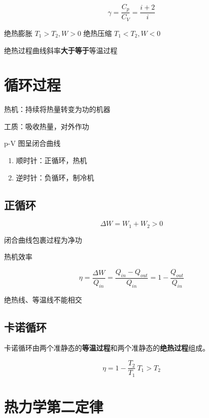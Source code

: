 \begin{enumerate}
          \begin{equation}
              \gamma{}=\frac{C_p}{C_V}=\frac{i+2}{i}
          \end{equation}

          绝热膨胀 $T_1>T_2,W>0$
          绝热压缩 $T_1<T_2,W<0$

          绝热过程曲线斜率\textbf{大于等于}等温过程

\end{enumerate}

\section{循环过程}

热机：持续将热量转变为功的机器

工质：吸收热量，对外作功

p-V 图呈闭合曲线

\begin{enumerate}
    \item 顺时针：正循环，热机
    \item 逆时针：负循环，制冷机
\end{enumerate}

\subsection{正循环}

\begin{equation}
    \Delta{W}=W_1+W_2>0
\end{equation}

闭合曲线包裹过程为净功

热机效率

\begin{equation}
    \eta=\frac{\Delta{W}}{Q_{in}}=\frac{Q_{in}-Q_{out}}{Q_{in}}=1-\frac{Q_{out}}{Q_{in}}
\end{equation}

绝热线、等温线不能相交

\subsection{卡诺循环}

卡诺循环由两个准静态的\textbf{等温过程}和两个准静态的\textbf{绝热过程}组成。

\begin{equation}
    \eta=1-\frac{T_2}{T_1}~T_1>T_2
\end{equation}

\section{热力学第二定律}

